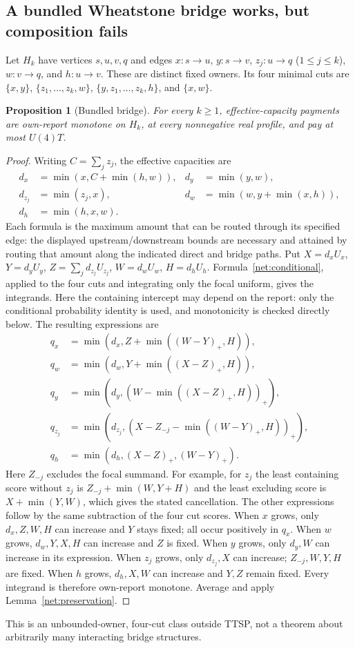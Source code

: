 \documentclass[11pt]{article}
\newtheorem{proposition}[theorem]{Proposition}
\theoremstyle{definition}\newtheorem{definition}[theorem]{Definition}
\theoremstyle{remark}\newtheorem{remark}[theorem]{Remark}
\begin{document}
\subsection{A bundled Wheatstone bridge works, but composition fails}
Let $H_k$ have vertices $s,u,v,q$ and edges
$x:s\to u$, $y:s\to v$, $z_j:u\to q$ ($1\le j\le k$),
$w:v\to q$, and $h:u\to v$.  These are distinct fixed owners.
Its four minimal cuts are
$\{x,y\}$, $\{z_1,\ldots,z_k,w\}$,
$\{y,z_1,\ldots,z_k,h\}$, and $\{x,w\}$.

\begin{proposition}[Bundled bridge]\label{net:bundle}
For every $k\ge1$, effective-capacity payments are own-report monotone on
$H_k$, at every nonnegative real profile, and pay at most $U(4)T$.
\end{proposition}
\begin{proof}
Writing $C=\sum_jz_j$, the effective capacities are
\[
 \begin{aligned}
 d_x&=\min(x,C+\min(h,w)),&d_y&=\min(y,w),\\
 d_{z_j}&=\min(z_j,x),&d_w&=\min(w,y+\min(x,h)),\\
 d_h&=\min(h,x,w).
 \end{aligned}
\]
Each formula is the maximum amount that can be routed through its specified
edge: the displayed upstream/downstream bounds are necessary and attained
by routing that amount along the indicated direct and bridge paths.
Put $X=d_xU_x$, $Y=d_yU_y$, $Z=\sum_jd_{z_j}U_{z_j}$,
$W=d_wU_w$, $H=d_hU_h$.  Formula~\eqref{net:conditional}, applied to the
four cuts and integrating only the focal uniform, gives the integrands.
Here the containing intercept may depend on the report: only the conditional
probability identity is used, and monotonicity is checked directly below.
The resulting expressions are
\[
 \begin{aligned}
 q_x&=\min(d_x,Z+\min((W-Y)_+,H)),\\
 q_w&=\min(d_w,Y+\min((X-Z)_+,H)),\\
 q_y&=\min(d_y,(W-\min((X-Z)_+,H))_+),\\
 q_{z_j}&=\min(d_{z_j},(X-Z_{-j}-\min((W-Y)_+,H))_+),\\
 q_h&=\min(d_h,(X-Z)_+,(W-Y)_+).
 \end{aligned}
\]
Here $Z_{-j}$ excludes the focal summand.  For example, for $z_j$ the
least containing score without $z_j$ is $Z_{-j}+\min(W,Y+H)$ and the least
excluding score is $X+\min(Y,W)$, which gives the stated cancellation.
The other expressions follow by the same subtraction of the four cut scores.
When $x$ grows, only $d_x,Z,W,H$ can increase and $Y$ stays fixed; all occur
positively in $q_x$.  When $w$ grows, $d_w,Y,X,H$ can increase and $Z$ is
fixed.  When $y$ grows, only $d_y,W$ can increase in its expression.
When $z_j$ grows, only $d_{z_j},X$ can increase; $Z_{-j},W,Y,H$ are fixed.
When $h$ grows, $d_h,X,W$ can increase and $Y,Z$ remain fixed.
Every integrand is therefore own-report monotone.  Average and apply
Lemma~\ref{net:preservation}.
\end{proof}
This is an unbounded-owner, four-cut class outside TTSP, not a theorem about
arbitrarily many interacting bridge structures.
\end{document}
